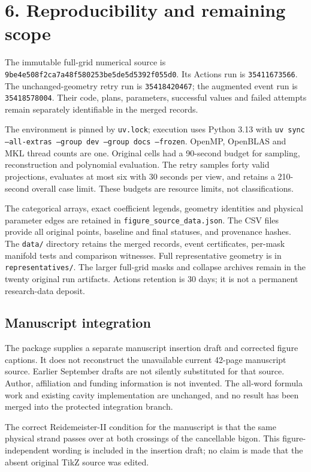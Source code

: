 \documentclass[10pt,a4paper]{article}
\begin{document}
\newpage
\section*{6. Reproducibility and remaining scope}


The immutable full-grid numerical source is \texttt{9be4e508f2ca7a48f580253be5de5d5392f055d0}. Its Actions run is \texttt{35411673566}. The unchanged-geometry retry run is \texttt{35418420467}; the augmented event run is \texttt{35418578004}. Their code, plans, parameters, successful values and failed attempts remain separately identifiable in the merged records.

The environment is pinned by \texttt{uv.lock}; execution uses Python 3.13 with \texttt{uv sync --all-extras --group dev --group docs --frozen}. OpenMP, OpenBLAS and MKL thread counts are one. Original cells had a 90-second budget for sampling, reconstruction and polynomial evaluation. The retry samples forty valid projections, evaluates at most six with 30 seconds per view, and retains a 210-second overall case limit. These budgets are resource limits, not classifications.

The categorical arrays, exact coefficient legends, geometry identities and physical parameter edges are retained in \texttt{figure\_source\_data.json}. The CSV files provide all original points, baseline and final statuses, and provenance hashes. The \texttt{data/} directory retains the merged records, event certificates, per-mask manifold tests and comparison witnesses. Full representative geometry is in \texttt{representatives/}. The larger full-grid masks and collapse archives remain in the twenty original run artifacts. Actions retention is 30 days; it is not a permanent research-data deposit.

\subsection*{Manuscript integration}
The package supplies a separate manuscript insertion draft and corrected figure captions. It does not reconstruct the unavailable current 42-page manuscript source. Earlier September drafts are not silently substituted for that source. Author, affiliation and funding information is not invented. The all-word formula work and existing cavity implementation are unchanged, and no result has been merged into the protected integration branch.

The correct Reidemeister-II condition for the manuscript is that the same physical strand passes over at both crossings of the cancellable bigon. This figure-independent wording is included in the insertion draft; no claim is made that the absent original TikZ source was edited.
\end{document}
